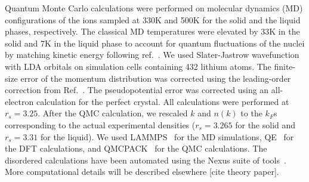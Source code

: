 \documentclass[twocolumn,showpacs,showkeys,fleqn,prl,superscriptaddress]{revtex4}%
\begin{document}
Quantum Monte Carlo calculations were performed on molecular dynamics (MD) configurations of the ions sampled at 330K and 500K for the solid and the liquid phases, respectively. The classical MD temperatures were elevated by 33K in the solid and 7K in the liquid phase to account for quantum fluctuations of the nuclei by matching kinetic energy following ref.~\cite{filippi98}. We used Slater-Jastrow wavefunction with LDA orbitals on simulation cells containing 432 lithium atoms. The finite-size error of the momentum distribution was corrected using the leading-order correction from Ref.~\cite{holz09}. The pseudopotential error was corrected using an all-electron calculation for the perfect crystal. All calculations were performed at $r_s=3.25$. After the QMC calculation, we rescaled $k$ and $n(k)$ to the $k_F$s corresponding to the actual experimental densities ($r_s=3.265$ for the solid and $r_s=3.31$ for the liquid). We used LAMMPS~\cite{Plimpton1993} for the MD simulations, QE~\cite{Giannozzi2009,Enkovaara2017} for the DFT calculations, and QMCPACK~\cite{Kim2018} for the QMC calculations. The disordered calculations have been automated using the Nexus suite of tools~\cite{Krogel2016}.
More computational details will be described elsewhere [cite theory paper].
\end{document}
